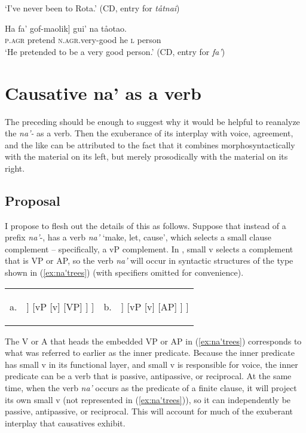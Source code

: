 \documentclass[output=paper,
modfonts
]{LSP/langsci}
\begin{document}
\begin{exe}
\begin{xlist}
\glt `I've never been to Rota.' (CD, entry for \emph{tåtnai})

\ex \label{ex:chung:25b} \gll  {[}Ha fa' gof-maolik{]} gui' na tåotao.\\
\textsc{p.agr} pretend \textsc{n.agr.}very-good he \textsc{l} person\\
\glt `He pretended to be a very good person.' (CD, entry for \emph{fa'})
\z
\z

\section{Causative {na'} as a  verb}\label{sec:chung:6}
The preceding should be enough to suggest why it would be helpful to
reanalyze the  \emph{na'-} as a  verb.
Then the exuberance of its interplay with voice, agreement, and the like
can be attributed to the fact that it combines morphosyntactically with
the material on its left, but merely prosodically with the material on
its right.

\subsection{Proposal}

I propose to flesh out the details of this  as follows.
Suppose that instead of a  prefix \emph{na'}-,  has a
 verb \emph{na'} `make, let, cause', which selects
a small clause complement -- specifically, a vP complement. In ,
small v selects a complement that is VP or AP, so the verb \emph{na'}
will occur in syntactic structures of the type shown in (\ref{ex:na'trees}) (with
specifiers omitted for convenience).

\ea \label{ex:chung:26}
\begin{tabularx}{\linewidth-0.1em}[t]{lXlX}
	a. &
	\begin{forest}
		[VP
			[V
				[na']
			]
			[vP
				[v]
				[VP]
			]
		]
	\end{forest} &
b. &
\begin{forest}
		[VP
			[V
				[na']
			]
			[vP
				[v]
				[AP]
			]
		]
	\end{forest} \\	
\end{tabularx}\label{ex:na'trees}
\z

The V or A that heads the embedded VP or AP in (\ref{ex:na'trees}) corresponds to what
was referred to earlier as the inner predicate. Because the inner
predicate has small v in its functional layer, and small v is
responsible for voice, the inner predicate can be a verb that is
passive, antipassive, or reciprocal. At the same time, when the verb
\emph{na'} occurs as the predicate of a finite clause, it will project
its own small v (not represented in (\ref{ex:na'trees})), so it can independently be
passive, antipassive, or reciprocal. This will account for much of the
exuberant interplay that causatives exhibit.


\end{xlist}
\end{exe}
\end{document}
